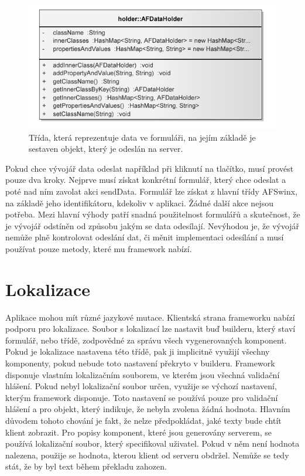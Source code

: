 \begin{figure}[h!]
\begin{center}
\includegraphics{images/AFDataHolder}
\caption{Třída, která reprezentuje data ve formuláři, na jejím základě je sestaven objekt, který je odeslán na server.}
\label{img:afDataHolder}
\end{center}
\end{figure}

Pokud chce vývojář data odeslat například při kliknutí na tlačítko, musí provést pouze dva kroky. Nejprve musí získat konkrétní formulář, který chce odeslat a poté nad ním zavolat akci sendData. Formulář lze získat z hlavní třídy AFSwinx, na základě jeho identifikátoru, kdekoliv v aplikaci. Žádné další akce nejsou potřeba. Mezi hlavní výhody patří snadná použitelnost formulářů a skutečnost, že je vývojář odstíněn od způsobu jakým se data odesílají. Nevýhodou je, že vývojář nemůže plně kontrolovat odeslání dat, či měnit implementaci odesílání a musí používat pouze metody, které mu framework nabízí.
\section{Lokalizace}
Aplikace mohou mít různé jazykové mutace. Klientská strana frameworku nabízí podporu pro lokalizace. Soubor s lokalizací lze nastavit buď builderu, který staví formulář, nebo třídě, zodpovědné za správu všech vygenerovaných komponent. Pokud je lokalizace nastavena této třídě, pak ji implicitně využijí všechny komponenty, pokud nebude toto nastavení překryto v builderu. Framework disponuje vlastním lokalizačním souborem, ve kterém jsou všechná validační hlášení. Pokud nebyl lokalizační soubor určen, využije se výchozí nastavení, kterým framework disponuje. Toto nastavení se používá pouze pro validační hlášení a pro objekt, který indikuje, že nebyla zvolena žádná hodnota. Hlavním důvodem tohoto chování je fakt, že nelze předpokládat, jaké texty bude chtít klient zobrazit. Pro popisy komponent, které jsou generovány serverem, se používá lokalizační soubor, který specifikoval uživatel. Pokud v něm není hodnota nalezena, použije se hodnota, kterou klient od serveru obdržel. Nemůže se tedy stát, že by byl text během překladu zahozen.
